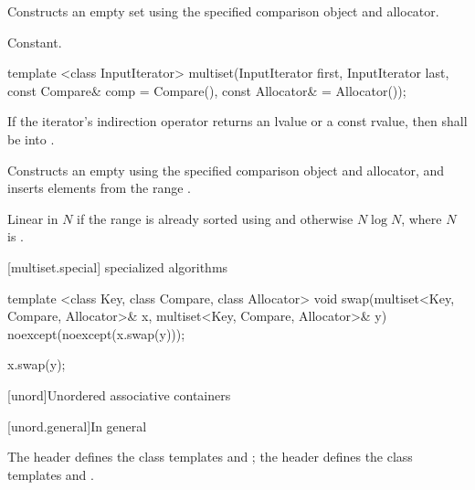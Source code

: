 \begin{itemdescr}
\pnum
\effects
Constructs an empty set using the specified comparison object and allocator.

\pnum
\complexity
Constant.
\end{itemdescr}

%
%
\begin{itemdecl}
template <class InputIterator>
  multiset(InputIterator first, InputIterator last,
           const Compare& comp = Compare(), const Allocator& = Allocator());
\end{itemdecl}

\begin{itemdescr}
\pnum
\requires If the iterator's indirection operator returns an lvalue or a
const rvalue, then  shall be
 into .

\pnum
\effects
Constructs an empty
using the specified comparison object and allocator,
and inserts elements from the range
.

\pnum
\complexity
Linear in $N$
if the range
is already sorted using  and otherwise $N \log{N}$,
where $N$ is
.
\end{itemdescr}

[multiset.special]{ specialized algorithms}

%
%
\begin{itemdecl}
template <class Key, class Compare, class Allocator>
  void swap(multiset<Key, Compare, Allocator>& x,
            multiset<Key, Compare, Allocator>& y)
    noexcept(noexcept(x.swap(y)));
\end{itemdecl}

\begin{itemdescr}
\pnum
\effects
\begin{codeblock}
x.swap(y);
\end{codeblock}
\end{itemdescr}

[unord]{Unordered associative containers}

[unord.general]{In general}

\pnum
The header  defines the class templates
 and
; the header  defines the class templates
 and .

